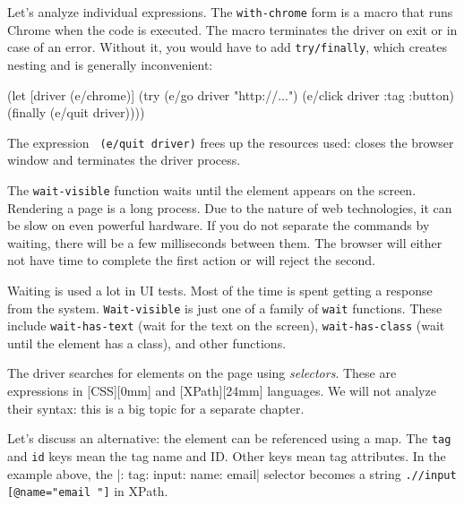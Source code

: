 \fi

Let's analyze individual expressions. The \verb|with-chrome| form is a macro that runs Chrome when the code is executed. The macro terminates the driver on exit or in case of an error. Without it, you would have to add \verb|try/finally|, which creates nesting and is generally inconvenient:


\begin{english}
  \begin{clojure}
(let [driver (e/chrome)]
  (try
    (e/go driver "http://...")
    (e/click driver {:tag :button})
    (finally
      (e/quit driver))))
  \end{clojure}
\end{english}

The expression \verb| (e/quit driver)| frees up the resources used: closes the browser window and terminates the driver process.

The \verb|wait-visible| function waits until the element appears on the screen. Rendering a page is a long process. Due to the nature of web technologies, it can be slow on even powerful hardware. If you do not separate the commands by waiting, there will be a few milliseconds between them. The browser will either not have time to complete the first action or will reject the second.

Waiting is used a lot in UI tests. Most of the time is spent getting a response from the system. \verb|Wait-visible| is just one of a family of \verb|wait| functions. These include \verb|wait-has-text| (wait for the text on the screen), \verb|wait-has-class| (wait until the element has a class), and other functions.


The driver searches for elements on the page using \emph{selectors}. These are expressions in [CSS][0mm] and [XPath][24mm] languages. We will not analyze their syntax: this is a big topic for a separate chapter.

Let's discuss an alternative: the element can be referenced using a map. The \verb|tag| and \verb|id| keys mean the tag name and ID. Other keys mean tag attributes. In the example above, the \spverb|{: tag: input: name: email}| selector becomes a string \verb|.//input [@name="email "]| in XPath.

